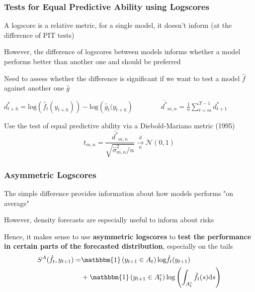 \documentclass{beamer}
\newenvironment{wideitemize}{\itemize\addtolength{\itemsep}{10pt}}{\enditemize}
\begin{document}
\begin{frame}
  \frametitle{Tests for Equal Predictive Ability using Logscores}
  \begin{wideitemize}
    \item A logscore is a relative metric, for a single model, it doesn't inform (at the difference of PIT tests)
    \item However, the difference of logscores between models informs whether a model performs better than another one and should be preferred
    \item Need to assess whether the difference is significant if we want to test a model $\hat{f}$ against another one $\hat{g}$
    \item $d^{*}_{t+h} = \text{log}\left(\hat{f}_t(y_{t+h})\right) - \text{log}\left(\hat{g}_t(y_{t+h} \right) \qquad \qquad \bar{d^*}_{m, n} = \frac{1}{n} \sum_{t=m}^{T-1} d^{*}_{t+1}$
    \item Use the test of equal predictive ability via a Diebold-Mariano metric (1995)
      \begin{equation*}
        t_{m,n} = \frac{\bar{d^*}_{m, n}}{\sqrt{\hat{\sigma}^2_{m,n}/n}} \xrightarrow[n]{d} \mathcal{N}(0, 1)
      \end{equation*}
  \end{wideitemize}
\end{frame}


\begin{frame}
  \frametitle{Asymmetric Logscores}
  \begin{wideitemize}
    \item The simple difference provides information about how models performs "on average"
    \item However, density forecasts are especially useful to inform about risks 
    \item Hence, it makes sense to use \textbf{asymmetric logscores} to \textbf{test the performance in certain parts of the forecasted distribution}, especially on the tails
      \begin{equation*}
        \begin{split}
          S^{A}(\hat{f}_t, y_{t+1}) = & \mathbbm{1}\left(y_{t+1} \in A_t\right) \text{log}\hat{f}_t(y_{t+1}) \\
          & +  \mathbbm{1}\left(y_{t+1} \in A^c_t\right)\text{log}\left( \int_{A^c_t} \hat{f}_t(s) \text{d}s \right)
        \end{split}
      \end{equation*}
  \end{wideitemize}
\end{frame}
\end{document}
